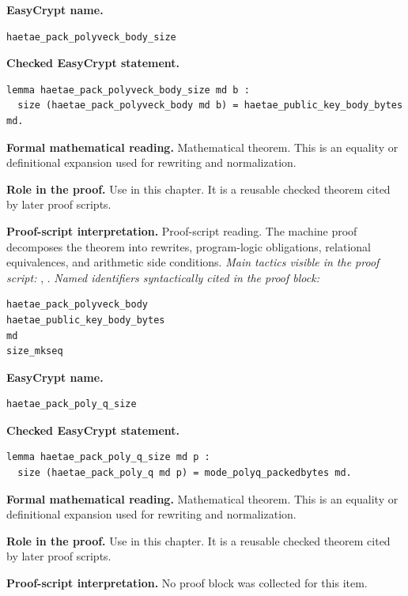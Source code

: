 \begin{formaltheorem}
\noindent\textbf{EasyCrypt name.}
\begin{lstlisting}[language=EasyCrypt,basicstyle=\ttfamily\scriptsize]
haetae_pack_polyveck_body_size
\end{lstlisting}
\noindent\textbf{Checked EasyCrypt statement.}
\begin{lstlisting}[language=EasyCrypt,basicstyle=\ttfamily\scriptsize]
lemma haetae_pack_polyveck_body_size md b :
  size (haetae_pack_polyveck_body md b) = haetae_public_key_body_bytes md.
\end{lstlisting}
\noindent\textbf{Formal mathematical reading.}
Mathematical theorem. This is an equality or definitional expansion used for rewriting and normalization.

\noindent\textbf{Role in the proof.}
Use in this chapter. It is a reusable checked theorem cited by later proof scripts.

\noindent\textbf{Proof-script interpretation.}
Proof-script reading. The machine proof decomposes the theorem into rewrites, program-logic obligations, relational equivalences, and arithmetic side conditions.
\emph{Main tactics visible in the proof script:} , .
\emph{Named identifiers syntactically cited in the proof block:}
\begin{lstlisting}[language=EasyCrypt,basicstyle=\ttfamily\scriptsize]
haetae_pack_polyveck_body
haetae_public_key_body_bytes
md
size_mkseq
\end{lstlisting}

\end{formaltheorem}

\begin{formaltheorem}
\noindent\textbf{EasyCrypt name.}
\begin{lstlisting}[language=EasyCrypt,basicstyle=\ttfamily\scriptsize]
haetae_pack_poly_q_size
\end{lstlisting}
\noindent\textbf{Checked EasyCrypt statement.}
\begin{lstlisting}[language=EasyCrypt,basicstyle=\ttfamily\scriptsize]
lemma haetae_pack_poly_q_size md p :
  size (haetae_pack_poly_q md p) = mode_polyq_packedbytes md.
\end{lstlisting}
\noindent\textbf{Formal mathematical reading.}
Mathematical theorem. This is an equality or definitional expansion used for rewriting and normalization.

\noindent\textbf{Role in the proof.}
Use in this chapter. It is a reusable checked theorem cited by later proof scripts.

\noindent\textbf{Proof-script interpretation.}
No proof block was collected for this item.

\end{formaltheorem}

